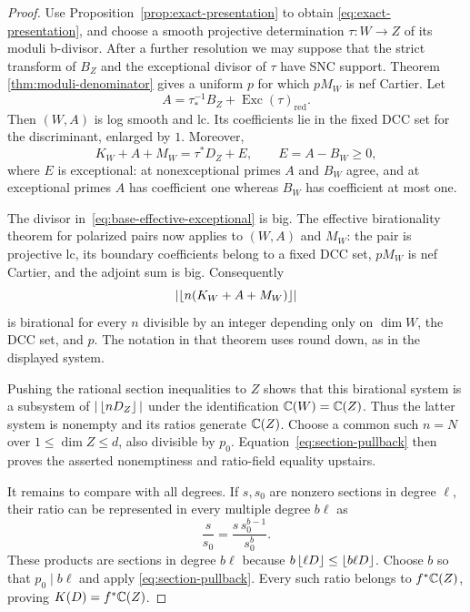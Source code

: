 \begin{proof}
Use Proposition~\ref{prop:exact-presentation} to obtain
\eqref{eq:exact-presentation}, and choose a smooth projective
determination $\tau:W\to Z$ of its moduli b-divisor.  After a further
resolution we may suppose that the strict transform of $B_Z$ and the
exceptional divisor of $\tau$ have SNC support.  Theorem~
\ref{thm:moduli-denominator} gives a uniform $p$ for which $pM_W$ is
nef Cartier.  Let
\[
 A=\tau_*^{-1}B_Z+\operatorname{Exc}(\tau)_{\mathrm{red}}.
\]
Then $(W,A)$ is log smooth and lc.  Its coefficients lie in the fixed
DCC set for the discriminant, enlarged by $1$.  Moreover,
\begin{equation}\label{eq:base-effective-exceptional}
 K_W+A+M_W=\tau^*D_Z+E,\qquad E=A-B_W\geq0,
\end{equation}
where $E$ is exceptional: at nonexceptional primes $A$ and $B_W$
agree, and at exceptional primes $A$ has coefficient one whereas
$B_W$ has coefficient at most one.

The divisor in~\eqref{eq:base-effective-exceptional} is big.
The effective birationality theorem for polarized pairs
\cite[Theorem~1.3]{BZ} now applies to $(W,A)$ and $M_W$: the pair is
projective lc, its boundary coefficients belong to a fixed DCC set,
$pM_W$ is nef Cartier, and the adjoint sum is big.  Consequently
\[
 \left|\left\lfloor n(K_W+A+M_W)\right\rfloor\right|
\]
is birational for every $n$ divisible by an integer depending only on
$\dim W$, the DCC set, and $p$.  The notation in that theorem uses
round down, as in the displayed system.

Pushing the rational section inequalities to $Z$ shows that this
birational system is a subsystem of $|\left\lfloor nD_Z\right\rfloor|$ under the
identification $\mathbb C(W)=\mathbb C(Z)$.  Thus the latter system is nonempty
and its ratios generate $\mathbb C(Z)$.  Choose a common such $n=N$ over
$1\leq\dim Z\leq d$, also divisible by $p_0$.
Equation~\eqref{eq:section-pullback} then proves the asserted
nonemptiness and ratio-field equality upstairs.

It remains to compare with all degrees.  If $s,s_0$ are nonzero
sections in degree $\ell$, their ratio can be represented in every
multiple degree $b\ell$ as
\begin{equation}\label{eq:ratio-multiple}
 \frac{s}{s_0}=\frac{s\,s_0^{b-1}}{s_0^b}.
\end{equation}
These products are sections in degree $b\ell$ because
$b\left\lfloor \ell D\right\rfloor\leq\left\lfloor b\ell D\right\rfloor$.
Choose $b$ so that $p_0\mid b\ell$ and apply
\eqref{eq:section-pullback}.  Every such ratio belongs to
$f^*\mathbb C(Z)$, proving $K(D)=f^*\mathbb C(Z)$.
\end{proof}

